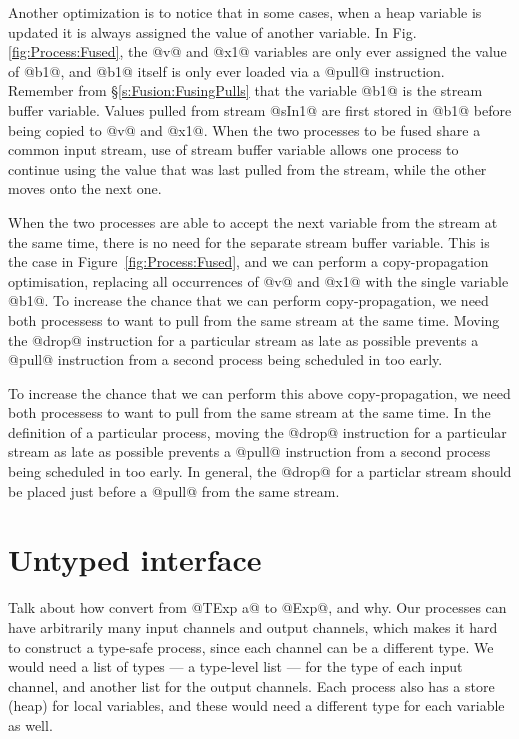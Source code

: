 Another optimization is to notice that in some cases, when a heap variable is updated it is always assigned the value of another variable. In Fig.\ref{fig:Process:Fused}, the @v@ and @x1@ variables are only ever assigned the value of @b1@, and @b1@ itself is only ever loaded via a @pull@ instruction. Remember from \S\ref{s:Fusion:FusingPulls} that the variable @b1@ is the stream buffer variable. Values pulled from stream @sIn1@ are first stored in @b1@ before being copied to @v@ and @x1@. When the two processes to be fused share a common input stream, use of stream buffer variable allows one process to continue using the value that was last pulled from the stream, while the other moves onto the next one. 


When the two processes are able to accept the next variable from the stream at the same time, there is no need for the separate stream buffer variable. This is the case in Figure~\ref{fig:Process:Fused}, and we can perform a copy-propagation optimisation, replacing all occurrences of @v@ and @x1@ with the single variable @b1@. To increase the chance that we can perform copy-propagation, we need both processess to want to pull from the same stream at the same time. Moving the @drop@ instruction for a particular stream as late as possible prevents a @pull@ instruction from a second process being scheduled in too early.

To increase the chance that we can perform this above copy-propagation, we need both processess to want to pull from the same stream at the same time. In the definition of a particular process, moving the @drop@ instruction for a particular stream as late as possible prevents a @pull@ instruction from a second process being scheduled in too early. In general, the @drop@ for a particlar stream should be placed just before a @pull@ from the same stream. 


\section{Untyped interface}
Talk about how convert from @TExp a@ to @Exp@, and why.
Our processes can have arbitrarily many input channels and output channels, which makes it hard to construct a type-safe process, since each channel can be a different type.
We would need a list of types --- a type-level list --- for the type of each input channel, and another list for the output channels.
Each process also has a store (heap) for local variables, and these would need a different type for each variable as well.

